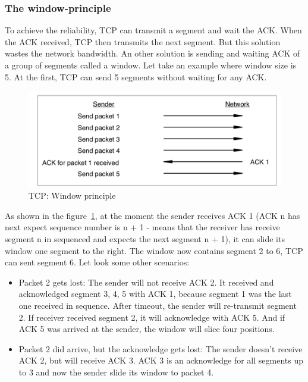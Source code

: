 \documentclass[a4paper, 11pt]{article}
\begin{document}
\subsubsection{The window-principle}
To achieve the reliability, TCP can transmit a segment and wait the ACK. When the ACK received, TCP then transmits the next segment. But this solution wastes the network bandwidth. An other solution is sending and waiting ACK of a group of segments called a window. Let take an example where window size is 5. At the first, TCP can send 5 segments without waiting for any ACK. 

\begin{figure}[h]
\includegraphics[scale=0.6]{window-principle.png}
\caption{TCP: Window principle}
\label{fig:window-principle}
\end{figure}

As shown in the figure~\ref{fig:window-principle}, at the moment the sender receives ACK 1 (ACK n has next expect sequence number is n + 1 - means that the receiver has receive segment n in sequenced and expects the next segment n + 1), it can slide its window one segment to the right. The window now contains segment 2 to 6, TCP can sent segment 6. Let look some other scenarios:

\begin{itemize}
\item Packet 2 gets lost: The sender will not receive ACK 2. It received and acknowledged segment 3, 4, 5 with ACK 1, because segment 1 was the last one received in sequence. After timeout, the sender will re-transmit segment 2. If receiver received segment 2, it will acknowledge with ACK 5. And if ACK 5 was arrived at the sender, the window will slice four positions.
\item Packet 2 did arrive, but the acknowledge gets lost: The sender doesn't receive ACK 2, but will receive ACK 3. ACK 3 is an acknowledge for all segments up to 3 and now the sender slide its window to packet 4.
\end{itemize}
\end{document}
